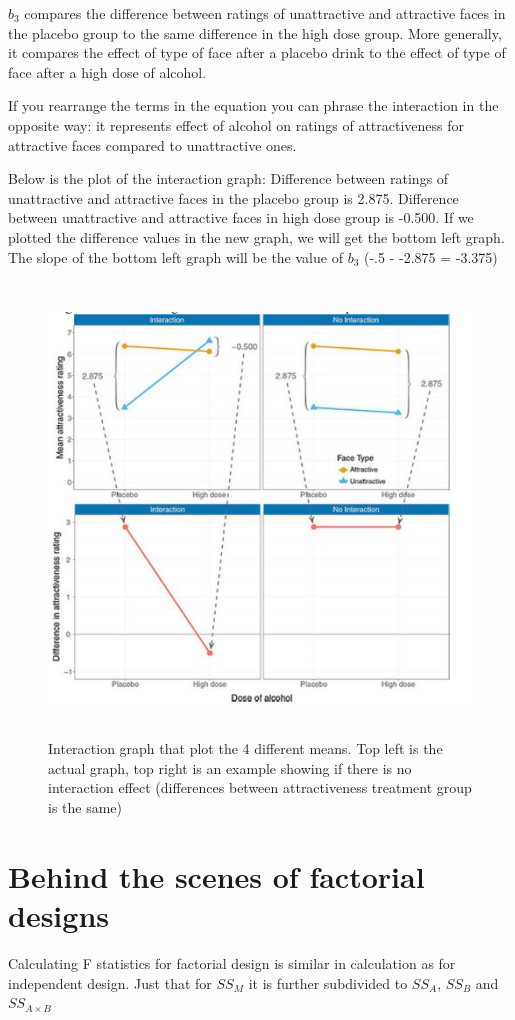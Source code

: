 $b_3$ compares the difference between ratings of unattractive and attractive faces in the placebo group to the same difference in the high dose group. More generally, it compares the effect of type of face after a placebo drink to the effect of type of face after a high dose of alcohol. 

If you rearrange the terms in the equation you can phrase the interaction in the opposite way: it represents effect of alcohol on ratings of attractiveness for attractive faces compared to unattractive ones.

Below is the plot of the interaction graph:
Difference between ratings of unattractive and attractive faces in the placebo group is 2.875. Difference between unattractive and attractive faces in high dose group is -0.500. If we plotted the difference values in the new graph, we will get the bottom left graph. The slope of the bottom left graph will be the value of $b_3$ (-.5 - -2.875 = -3.375)
\begin{figure}[h]
	\includegraphics[width=1\textwidth,height=120mm]{Chapter 14 GLM 3 Factorial Designs/interactiongraph.PNG}
	\caption{Interaction graph that plot the 4 different means. Top left is the actual graph, top right is an example showing if there is no interaction effect (differences between attractiveness treatment group is the same)}
\end{figure}

\clearpage
\section{Behind the scenes of factorial designs}
Calculating F statistics for factorial design is similar in calculation as for independent design. Just that for $SS_M$ it is further subdivided to $SS_A$, $SS_B$ and $SS_{A\times B}$

